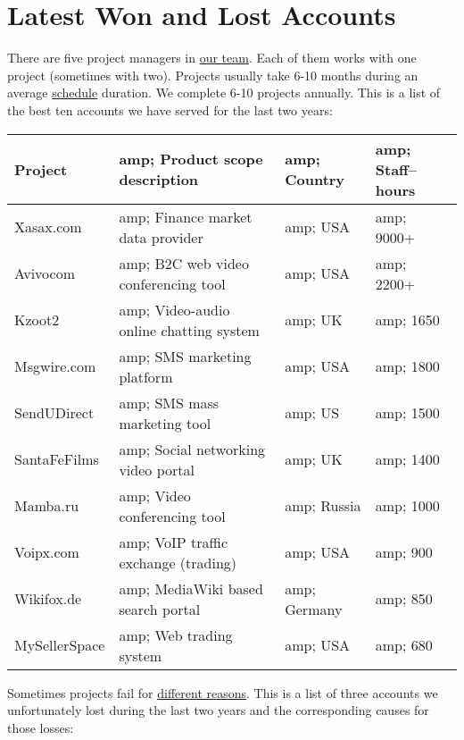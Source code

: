 \section*{Latest Won and Lost Accounts}

There are five project managers in \href{${url:about/teams}}{our team}. Each of them
works with one project (sometimes with two). Projects usually take 6-10 months during an average 
\href{${url:process/time/schedule}}{schedule} duration. We
complete 6-10 projects annually. This is a list of the best ten accounts we have served 
for the last two years:
	       
\begin{center}\small%
\begin{tabular}{l>{\raggedright}p{6cm}lp{2cm}}
Project &amp; 		Product scope description &amp; 	Country &amp; 	Staff--hours \\
\hline
Xasax.com &amp; 	Finance market data provider &amp; 	USA &amp;	9000+ \\
Avivocom &amp; 		B2C web video conferencing tool &amp; 	USA &amp;	2200+ \\
Kzoot2 &amp; 		Video-audio online chatting 
			system &amp;				UK &amp;	1650 \\
Msgwire.com &amp; 	SMS marketing platform &amp; 		USA &amp;	1800 \\
SendUDirect &amp; 	SMS mass marketing tool &amp;		US &amp;	1500 \\
SantaFeFilms &amp; 	Social networking video portal &amp;	UK &amp;	1400 \\
Mamba.ru &amp; 		Video conferencing tool &amp; 		Russia &amp;	1000 \\
Voipx.com &amp; 	VoIP traffic exchange (trading) &amp; 	USA &amp;	900 \\
Wikifox.de &amp; 	MediaWiki based search portal &amp; 	Germany &amp;	850 \\
MySellerSpace &amp; 	Web trading system &amp; 		USA &amp;	680 \\
\end{tabular}\end{center}

Sometimes projects fail for \href{${url:process/risk/risk}}{different reasons}. This is a list of 
three accounts we unfortunately lost during the last two years and the corresponding causes
for those losses:

